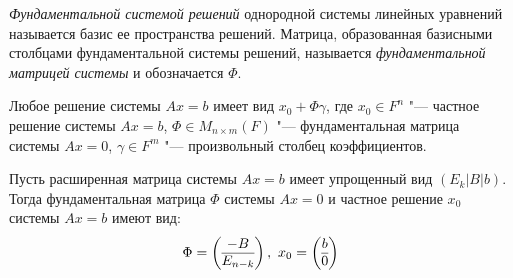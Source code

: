 \begin{definition}
	\textit{Фундаментальной системой решений} однородной системы линейных уравнений называется базис ее пространства решений. Матрица, образованная базисными столбцами фундаментальной системы решений, называется \textit{фундаментальной матрицей системы} и обозначается $\Phi$.
\end{definition}

\begin{note}
	Любое решение системы $Ax = b$ имеет вид $x_0 + \Phi\gamma$, где $x_0 \in F^n$ "--- частное решение системы $Ax = b$, $\Phi \in M_{n \times m}(F)$ "--- фундаментальная матрица системы $Ax = 0$, $\gamma \in F^m$ "--- произвольный столбец коэффициентов.
\end{note}

\begin{theorem}
	Пусть расширенная матрица системы $Ax = b$ имеет упрощенный вид $(E_k|B|b)$. Тогда фундаментальная матрица $\Phi$ системы $Ax = 0$ и частное решение $x_0$ системы $Ax = b$ имеют вид:
	\[\Phi = \left(\begin{array}{@{}c@{}}-B\\\hline E_{n - k}\end{array}\right),~
	x_0 = \left(\begin{array}{@{}c@{}}b\\\hline 0\end{array}\right)\]
\end{theorem}

